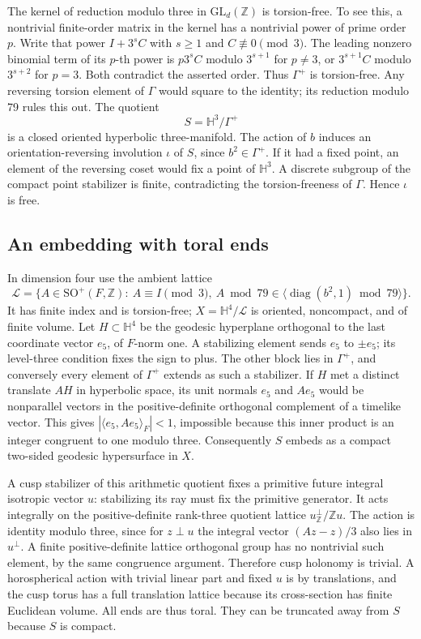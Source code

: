 \documentclass[11pt]{article}
\theoremstyle{remark}
\newcommand{\diag}{\operatorname{diag}}
\newcommand{\ZZ}{\mathbb Z}
\newcommand{\HH}{\mathbb H}
\begin{document}
The kernel of reduction modulo three in \(\mathrm{GL}_d(\ZZ)\) is torsion-free. To see this, a nontrivial finite-order matrix in the kernel has a nontrivial power of prime order \(p\). Write that power \(I+3^s C\) with \(s\ge1\) and \(C\not\equiv0\pmod3\). The leading nonzero binomial term of its \(p\)-th power is \(p3^s C\) modulo \(3^{s+1}\) for \(p\ne3\), or \(3^{s+1}C\) modulo \(3^{s+2}\) for \(p=3\). Both contradict the asserted order. Thus \(\Gamma^+\) is torsion-free. Any reversing torsion element of \(\Gamma\) would square to the identity; its reduction modulo 79 rules this out. The quotient
\[
 S=\HH^3/\Gamma^+
\]
is a closed oriented hyperbolic three-manifold. The action of \(b\) induces an orientation-reversing involution \(\iota\) of \(S\), since \(b^2\in\Gamma^+\). If it had a fixed point, an element of the reversing coset would fix a point of \(\HH^3\). A discrete subgroup of the compact point stabilizer is finite, contradicting the torsion-freeness of \(\Gamma\). Hence \(\iota\) is free.

\subsection{An embedding with toral ends}

In dimension four use the ambient lattice
\begin{equation}\label{eq:lattice}
 \mathcal L=\{A\in\mathrm{SO}^+(F,\ZZ):\ A\equiv I\pmod3,\ 
       A\bmod79\in\langle\diag(b^2,1)\bmod79\rangle\}.
\end{equation}
It has finite index and is torsion-free; \(X=\HH^4/\mathcal L\) is oriented, noncompact, and of finite volume. Let \(H\subset\HH^4\) be the geodesic hyperplane orthogonal to the last coordinate vector \(e_5\), of \(F\)-norm one. A stabilizing element sends \(e_5\) to \(\pm e_5\); its level-three condition fixes the sign to plus. The other block lies in \(\Gamma^+\), and conversely every element of \(\Gamma^+\) extends as such a stabilizer. If \(H\) met a distinct translate \(AH\) in hyperbolic space, its unit normals \(e_5\) and \(Ae_5\) would be nonparallel vectors in the positive-definite orthogonal complement of a timelike vector. This gives \(|\langle e_5,Ae_5\rangle_F|<1\), impossible because this inner product is an integer congruent to one modulo three. Consequently \(S\) embeds as a compact two-sided geodesic hypersurface in \(X\).

A cusp stabilizer of this arithmetic quotient fixes a primitive future integral isotropic vector \(u\): stabilizing its ray must fix the primitive generator. It acts integrally on the positive-definite rank-three quotient lattice \(u^\perp_{\ZZ}/\ZZ u\). The action is identity modulo three, since for \(z\perp u\) the integral vector \((Az-z)/3\) also lies in \(u^\perp\). A finite positive-definite lattice orthogonal group has no nontrivial such element, by the same congruence argument. Therefore cusp holonomy is trivial. A horospherical action with trivial linear part and fixed \(u\) is by translations, and the cusp torus has a full translation lattice because its cross-section has finite Euclidean volume. All ends are thus toral. They can be truncated away from \(S\) because \(S\) is compact.
\end{document}
